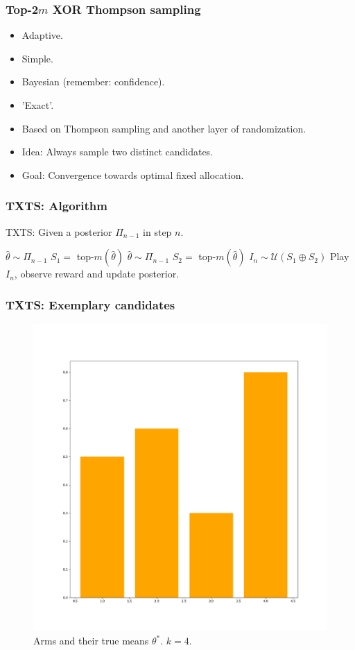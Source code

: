 \documentclass[aspectratio=43]{beamer}
\begin{document}
\begin{frame}
\frametitle{Top-2$m$ XOR Thompson sampling}
\begin{itemize}[<+->]
  \item Adaptive.
  \item Simple.
  \item Bayesian (remember: confidence).
  \item 'Exact'.
  \item Based on Thompson sampling and another layer of randomization.
  \item Idea: Always sample two distinct candidates.
  \item Goal: Convergence towards optimal fixed allocation.
\end{itemize}
\end{frame}

\begin{frame}
\frametitle{TXTS: Algorithm}
\begin{algorithm}[H]
  \caption{TXTS: Given a posterior $\Pi_{n-1}$ in step $n$.}
  \label{alg:TXTS}
  \begin{algorithmic}
    \State $\hat{\theta} \sim \Pi_{n-1}$
    \State $S_1 =$ top-$m(\hat{\theta})$
    \Repeat
      \State $\hat{\theta} \sim \Pi_{n-1}$
      \State $S_2 = $ top-$m(\hat{\theta})$
    \State $I_n \sim \mathcal{U}(S_1 \oplus S_2)$
    \State Play $I_n$, observe reward and update posterior.
  \end{algorithmic}
\end{algorithm}
\end{frame}

\begin{frame}
  \frametitle{TXTS: Exemplary candidates}
  \begin{figure}[h]
    \centering
    \includegraphics[width=.5\textwidth]{191127-bandits_1.png}
    \caption{Arms and their true means $\theta^*$. $k=4$.}
  \end{figure}
\end{frame}
\end{document}
